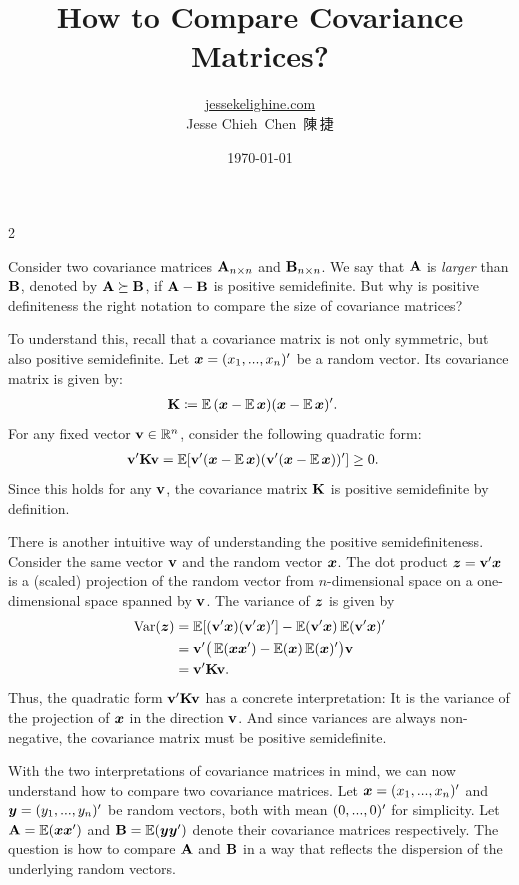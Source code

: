 \documentclass[a4paper]{article}
\title{How to Compare Covariance Matrices?}
\author{\href{https://jessekelighine.com}{jessekelighine.com}\\Jesse Chieh\ Chen\ 陳\,捷}
\date{\today}
\begin{document}
\maketitle

\begin{multicols}{2}

\noindent
Consider two covariance matrices $\AA_{n\times n}$ and $\BB_{n\times n}$.
We say that $\AA$ is \emph{larger} than $\BB$,
denoted by $\AA\succeq \BB$, if $\AA-\BB$ is positive semidefinite.
But why is positive definiteness the right notation to compare the size of covariance matrices?

To understand this,
recall that a covariance matrix is not only symmetric,
but also positive semidefinite.
Let $\xx=(x_1,...,x_n)\T$ be a random vector.
Its covariance matrix is given by:
\begin{align}
	\KK &\coloneqq \E{(\xx-\E{\xx})(\xx-\E{\xx})\T}.
\end{align}
For any fixed vector $\vv\in\reals^n$,
consider the following quadratic form:
\begin{align}
	\vv\T \KK \vv &= \E[\vv\T(\xx-\E{\xx})(\vv\T(\xx-\E{\xx}))\T] \geq 0.
\end{align}
Since this holds for any $\vv$,
the covariance matrix $\KK$ is positive semidefinite by definition.

There is another intuitive way of understanding the positive semidefiniteness.
Consider the same vector $\vv$ and the random vector $\xx$.
The dot product $\zz=\vv\T \xx$ is a (scaled) projection of the random vector from $n$-dimensional
space on a one-dimensional space spanned by $\vv$.
The variance of $\zz$ is given by
\begin{align}
	\var(\zz)
	&= \E[(\vv\T \xx)(\vv\T \xx)\T ] - \E(\vv\T \xx)\E(\vv\T \xx)\T  \\
	&= \vv\T \big(\E(\xx\xx\T ) - \E(\xx)\E(\xx)\T \big)\vv \\
	&= \vv\T \KK\vv.
\end{align}
Thus, the quadratic form $\vv\T\KK\vv$ has a concrete interpretation:
It is the variance of the projection of $\xx$ in the direction $\vv$.
And since variances are always non-negative, the covariance matrix must be positive semidefinite.

With the two interpretations of covariance matrices in mind,
we can now understand how to compare two covariance matrices.
Let $\xx=(x_1,...,x_n)\T$ and $\yy=(y_1,...,y_n)\T$ be random vectors,
both with mean $(0,...,0)\T$ for simplicity.
Let $\AA=\E(\xx\xx\T)$ and $\BB=\E(\yy\yy\T)$ denote their covariance matrices respectively.
The question is how to compare $\AA$ and $\BB$ in a way that reflects the dispersion of the underlying random vectors.


\end{multicols}
\end{document}
